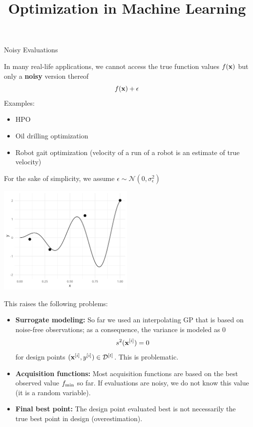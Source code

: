 \documentclass[11pt,compress,t,notes=noshow, xcolor=table]{beamer}
\title{Optimization in Machine Learning}
\date{}
\begin{document}


\begin{vbframe}{Noisy Evaluations}

In many real-life applications, we cannot access the true function values $f(\mathbf{x})$ but only a \textbf{noisy} version thereof
$$f(\mathbf{x}) + \epsilon$$
\vspace{1em}
Examples:
\begin{itemize}
    \item HPO
    \item Oil drilling optimization
    \item Robot gait optimization (velocity of a run of a robot is an estimate of true velocity)
\end{itemize}
\vspace{1em}

\framebreak

\vspace{1em}

For the sake of simplicity, we assume $\epsilon \sim \mathcal{N}\left(0, \sigma_{\epsilon}^{2}\right)$

\begin{center}
  \includegraphics[width = 0.5\textwidth]{figure_man/noisy_0.png}
\end{center}

\framebreak 


This raises the following problems: 

\begin{itemize}
  \item \textbf{Surrogate modeling:} So far we used an interpolating GP that is based on noise-free observations; as a consequence, the variance is modeled as $0$
  $$
    s^2(\mathbf{x}^{[i]}) = 0
  $$
  for design points $(\mathbf{x}^{[i]}, y^{[i]}) \in \mathcal{D}^{[t]}$. This is problematic. 
  \item \textbf{Acquisition functions:} Most acquisition functions are based on the best observed value $f_{\min}$ so far. If evaluations are noisy, we do not know this value (it is a random variable).
  \item \textbf{Final best point:} The design point evaluated best is not necessarily the true best point in design (overestimation). 
\end{itemize}


\end{vbframe}
\end{document}
